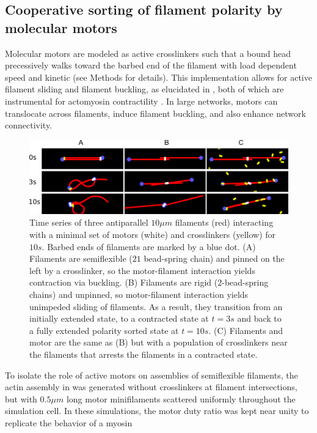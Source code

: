 \documentclass[12pt]{article}
\begin{document}
\subsection{Cooperative sorting of filament polarity by molecular motors}
Molecular motors are modeled as active crosslinkers such that a bound head 
precessively walks toward the barbed end of the filament with load dependent 
speed and kinetic (see Methods for details).
This implementation allows for active filament sliding and filament buckling, 
as elucidated in , 
both of which are instrumental for actomyosin contractility \cite{murrell2012}.
In large networks, motors can translocate across filaments, induce filament 
buckling, and also enhance network connectivity\cite{murrell2014}. 
\begin{figure}[H] 
  \centering
  \includegraphics[width=\textwidth]{figs/minimal.pdf}
  \caption{\label{fig:slide}
  \label{fig:toys}%
  Time series of three antiparallel $10\mu m$ filaments (red) interacting with a
  minimal set of motors (white) and crosslinkers (yellow) for $10s$. Barbed ends
  of filaments are marked by a blue dot.  
  (A) Filaments are semiflexible ($21$ bead-spring chain) and pinned on the left
  by a crosslinker, so the motor-filament interaction yields contraction via buckling. 
  (B) Filaments are rigid ($2$-bead-spring chains) and unpinned, so 
  motor-filament interaction yields unimpeded sliding of filaments. As a result,
  they transition from an initially extended state, to a contracted state
  at $t=3s$ and back to a fully extended polarity sorted state at $t=10s$.
  (C) Filaments and motor are the same as (B) but with a population of
crosslinkers near the filaments that arrests the filaments in a contracted state. } 
\end{figure}
To isolate the role of active motors on assemblies of semiflexible filaments,
the actin assembly in  was generated without crosslinkers at
filament intersections, but with $0.5\mu m$ long motor minifilaments
scattered uniformly throughout the simulation cell. In these simulations, the 
motor duty ratio was kept near unity to replicate the behavior of a myosin 
\end{document}
